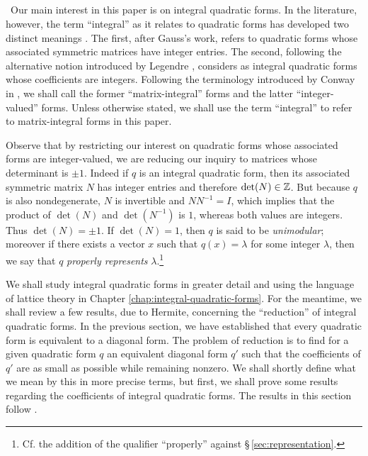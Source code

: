 \subsection{}~Our main interest in this paper is on integral quadratic forms. In
the literature, however, the term ``integral'' as it relates to quadratic forms
has developed two distinct meanings \cite{conway1999universal,
conway1997sensual}. The first, after Gauss's work, refers to quadratic forms
whose associated symmetric matrices have integer entries. The second, following
the alternative notion introduced by Legendre \cite{legendre1808essai},
considers as integral quadratic forms whose coefficients are integers. Following
the terminology introduced by Conway in \cite{conway1997sensual}, we shall call
the former ``matrix-integral'' forms and the latter ``integer-valued'' forms.
Unless otherwise stated, we shall use the term ``integral'' to refer to
matrix-integral forms in this paper. \label{sec:integral-forms-def}

Observe that by restricting our interest on quadratic forms whose associated
forms are integer-valued, we are reducing our inquiry to matrices whose
determinant is \(\pm 1\). Indeed if \(q\) is an integral quadratic form, then
its associated symmetric matrix \(N\) has integer entries and therefore
\(\det(N) \in \mathbb{Z}\). But because \(q\) is also nondegenerate, \(N\) is
invertible and \(NN^{-1} = I\), which implies that the product of \(\det(N)\)
and \(\det(N^{-1})\) is \(1\), whereas both values are integers. Thus \(\det(N)
= \pm 1\). If \(\det(N) = 1\), then \(q\) is said to be \emph{unimodular};
moreover if there exists a vector \(x\) such that \(q(x) = \lambda\) for some
integer \(\lambda\), then we say that \(q\) \emph{properly represents}
\(\lambda\).\footnote{Cf. the addition of the qualifier ``properly'' against
\S\,\ref{sec:representation}.}

We shall study integral quadratic forms in greater detail and using the language
of lattice theory in Chapter \ref{chap:integral-quadratic-forms}. For the
meantime, we shall review a few results, due to Hermite, concerning the
``reduction'' of integral quadratic forms. In the previous section, we have
established that every quadratic form is equivalent to a diagonal form. The
problem of reduction is to find for a given quadratic form \(q\) an equivalent
diagonal form \(q'\) such that the coefficients of \(q'\) are as small as
possible while remaining nonzero. We shall shortly define what we mean by this
in more precise terms, but first, we shall prove some results regarding the
coefficients of integral quadratic forms. The results in this section follow
\cite{cassels2008rational,jones1950arithmetic,
watson1960integral}.\label{sec:reduction}

